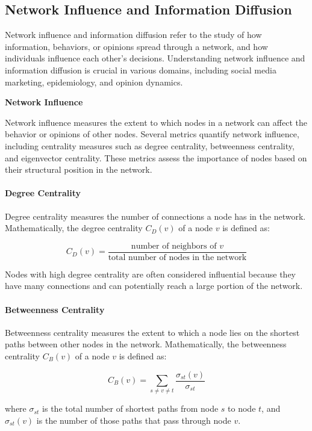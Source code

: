 \documentclass[12pt]{book} %
\begin{document}
\subsection{Network Influence and Information Diffusion}

Network influence and information diffusion refer to the study of how information, behaviors, or opinions spread through a network, and how individuals influence each other's decisions. Understanding network influence and information diffusion is crucial in various domains, including social media marketing, epidemiology, and opinion dynamics.

\textbf{Network Influence}

Network influence measures the extent to which nodes in a network can affect the behavior or opinions of other nodes. Several metrics quantify network influence, including centrality measures such as degree centrality, betweenness centrality, and eigenvector centrality. These metrics assess the importance of nodes based on their structural position in the network.

\paragraph{Degree Centrality}

Degree centrality measures the number of connections a node has in the network. Mathematically, the degree centrality \(C_D(v)\) of a node \(v\) is defined as:

\[ C_D(v) = \frac{\text{number of neighbors of } v}{\text{total number of nodes in the network}} \]

Nodes with high degree centrality are often considered influential because they have many connections and can potentially reach a large portion of the network.

\paragraph{Betweenness Centrality}

Betweenness centrality measures the extent to which a node lies on the shortest paths between other nodes in the network. Mathematically, the betweenness centrality \(C_B(v)\) of a node \(v\) is defined as:

\[ C_B(v) = \sum_{s \neq v \neq t} \frac{\sigma_{st}(v)}{\sigma_{st}} \]

where \(\sigma_{st}\) is the total number of shortest paths from node \(s\) to node \(t\), and \(\sigma_{st}(v)\) is the number of those paths that pass through node \(v\).
\end{document}

